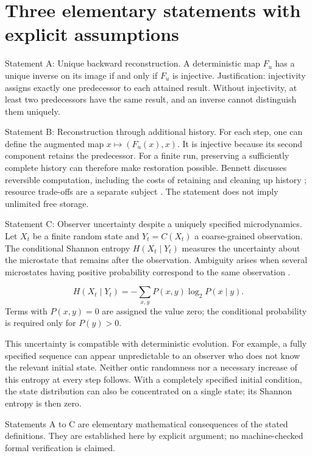 \section{Three elementary statements with explicit assumptions}\label{en:sec3}
Statement A: Unique backward reconstruction. A deterministic map \(F_u\) has a unique inverse on its image if and only if \(F_u\) is injective. Justification: injectivity assigns exactly one predecessor to each attained result. Without injectivity, at least two predecessors have the same result, and an inverse cannot distinguish them uniquely.

Statement B: Reconstruction through additional history. For each step, one can define the augmented map \(x\mapsto (F_u(x),x)\). It is injective because its second component retains the predecessor. For a finite run, preserving a sufficiently complete history can therefore make restoration possible. Bennett discusses reversible computation, including the costs of retaining and cleaning up history \cite{6}; resource trade-offs are a separate subject \cite{7}. The statement does not imply unlimited free storage.

Statement C: Observer uncertainty despite a uniquely specified microdynamics. Let \(X_t\) be a finite random state and \(Y_t=C(X_t)\) a coarse-grained observation. The conditional Shannon entropy \(H(X_t\mid Y_t)\) measures the uncertainty about the microstate that remains after the observation. Ambiguity arises when several microstates having positive probability correspond to the same observation \cite{8}.

\begin{equation}\label{en:eq3}
H(X_t\mid Y_t)=-\sum_{x,y}P(x,y)\log_2 P(x\mid y).
\end{equation}
Terms with \(P(x,y)=0\) are assigned the value zero; the conditional probability is required only for \(P(y)>0\).

This uncertainty is compatible with deterministic evolution. For example, a fully specified sequence can appear unpredictable to an observer who does not know the relevant initial state. Neither ontic randomness nor a necessary increase of this entropy at every step follows. With a completely specified initial condition, the state distribution can also be concentrated on a single state; its Shannon entropy is then zero.

Statements A to C are elementary mathematical consequences of the stated definitions. They are established here by explicit argument; no machine-checked formal verification is claimed.

